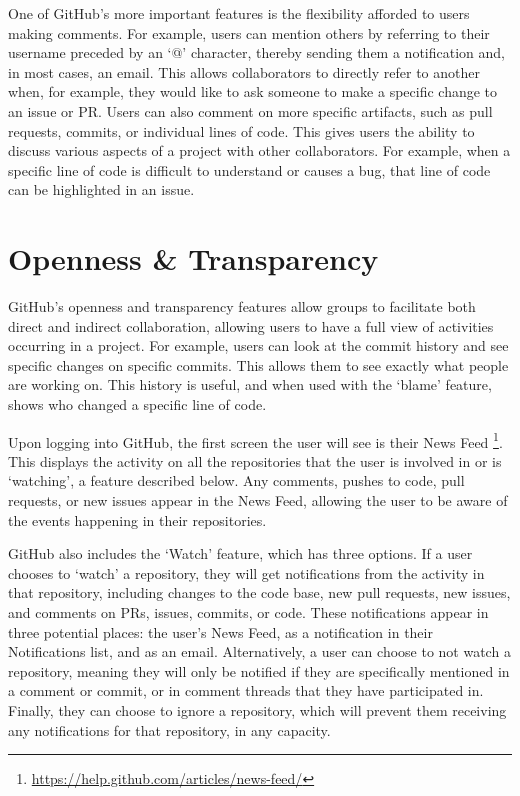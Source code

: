 One of GitHub's more important features is the flexibility afforded to users making comments. For example, users can mention others by referring to their username preceded by an `@' character, thereby sending them a notification and, in most cases, an email. This allows collaborators to directly refer to another when, for example, they would like to ask someone to make a specific change to an issue or PR. Users can also comment on more specific artifacts, such as pull requests, commits, or individual lines of code. This gives users the ability to discuss various aspects of a project with other collaborators. For example, when a specific line of code is difficult to understand or causes a bug, that line of code can be highlighted in an issue.

\section{Openness \& Transparency}
GitHub's openness and transparency features allow groups to facilitate both direct and indirect collaboration, allowing users to have a full view of activities occurring in a project. For example, users can look at the commit history and see specific changes on specific commits. This allows them to see exactly what people are working on. This history is useful, and when used with the `blame' feature, shows who changed a specific line of code. %

Upon logging into GitHub, the first screen the user will see is their News Feed \footnote{\url{https://help.github.com/articles/news-feed/}}. This displays the activity on all the repositories that the user is involved in or is `watching', a feature described below. Any comments, pushes to code, pull requests, or new issues appear in the News Feed, allowing the user to be aware of the events happening in their repositories.

GitHub also includes the `Watch' feature, which has three options. If a user chooses to `watch' a repository, they will get notifications from the activity in that repository, including changes to the code base, new pull requests, new issues, and comments on PRs, issues, commits, or code. These notifications appear in three potential places: the user's News Feed, as a notification in their Notifications list, and as an email. Alternatively, a user can choose to not watch a repository, meaning they will only be notified if they are specifically mentioned in a comment or commit, or in comment threads that they have participated in. Finally, they can choose to ignore a repository, which will prevent them receiving any notifications for that repository, in any capacity.

